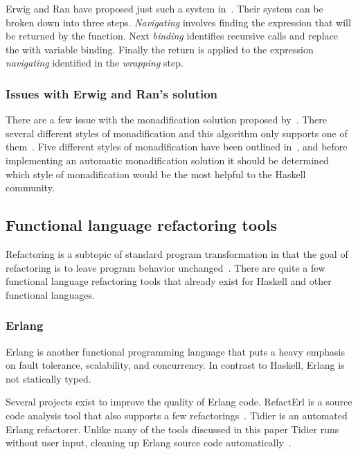 Erwig and Ran have proposed just such a system in~\citep{monadification}. Their system can be broken down into three steps. \textit{Navigating} involves finding the expression that will be returned by the function. Next \textit{binding} identifies recursive calls and replace the with variable binding. Finally the return is applied to the expression \textit{navigating} identified in the \textit{wrapping} step.

\subsubsection{Issues with Erwig and Ran's solution}

There are a few issue with the monadification solution proposed by~\citep{monadification}. There several different styles of monadification and this algorithm only supports one of them~\citep{clausMonadResponse}. Five different styles of monadification have been outlined in~\citep{monadSurvey}, and before implementing an automatic monadification solution it should be determined which style of monadification would be the most helpful to the Haskell community.

\subsection{Functional language refactoring tools}

Refactoring is a subtopic of standard program transformation in that the goal of refactoring is to leave program behavior unchanged~\citep{fowler}. There are quite a few functional language refactoring tools that already exist for Haskell and other functional languages. 

\subsubsection{Erlang}

Erlang is another functional programming language that puts a heavy emphasis on fault tolerance, scalability, and concurrency. In contrast to Haskell, Erlang is not statically typed.
 
Several projects exist to improve the quality of Erlang code. RefactErl is a source code analysis tool that also supports a few refactorings~\citep{refactErlWiki}. Tidier is an automated Erlang refactorer. Unlike many of the tools discussed in this paper Tidier runs without user input, cleaning up Erlang source code automatically~\citep{erlangTidier}.

